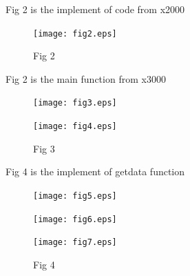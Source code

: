 \documentclass[twoside]{article}
\begin{document}
\begin{CJK*}{UTF8}{gbsn}
	Fig 2 is the implement of code from x2000
	\begin{figure}[htbp]
		\small
		\centering
		\texttt{[image: fig2.eps]}
		\caption{Fig 2} %
	\end{figure}

	Fig 2 is the main function from x3000

	\begin{figure}[htbp]
		\centering
		\caption{Fig 3} %
		\begin{minipage}[t]{0.4\textwidth}
			\small
			\centering
			\texttt{[image: fig3.eps]}
		\end{minipage}
		\begin{minipage}[t]{0.4\textwidth}
			\small
			\centering
			\texttt{[image: fig4.eps]}
		\end{minipage}
		
	\end{figure}
	
	
	
	Fig 4 is the implement of getdata function

	\begin{figure}[htbp]
		\centering
		\caption{Fig 4} %
		\begin{minipage}[t]{0.4\textwidth}
			\small
			\centering
			\texttt{[image: fig5.eps]}
		\end{minipage}
		\begin{minipage}[t]{0.4\textwidth}
			\small
			\centering
			\texttt{[image: fig6.eps]}
		\end{minipage}
		\begin{minipage}[t]{0.4\textwidth}
			\small
			\centering
			\texttt{[image: fig7.eps]}
		\end{minipage}
		
	\end{figure}


\end{CJK*}
\end{document}
